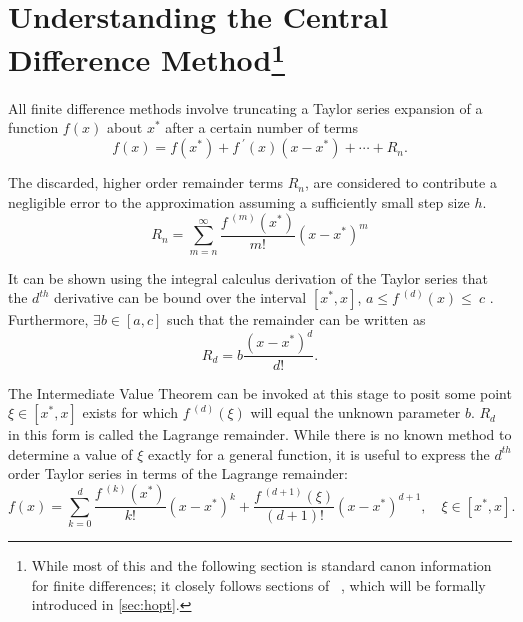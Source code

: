\section[Understanding Central Differences]{Understanding the Central Difference Method\footnote{While most of this and the following section is standard canon information for finite differences; it closely follows sections of \citeauthor{Mathur2012}~\cite{Mathur2012}, which will be formally introduced in \cref{sec:hopt}.}}\label{sec:ucdiff}

All finite difference methods involve truncating a Taylor series expansion of a function $f(x)$ about $x^*$ after a certain number of terms
\begin{equation}
    f(x) = f(x^*) + f^{\;\prime}(x)(x-x^*) + \cdots + R_n.
\end{equation}

The discarded, higher order remainder terms $R_n$, are considered to contribute a negligible error to the approximation assuming a sufficiently small step size $h$.
\begin{equation}
    R_n = \sum_{m=n}^\infty \frac{f^{\;(m)}(x^*)}{m!}(x-x^*)^m
\end{equation}

It can be shown using the integral calculus derivation of the Taylor series that the $d^{th}$ derivative can be bound over the interval $[x^*, x]$, \ie $a\leq f^{\;(d)}(x) \leq~c$ \cite{Greenberg1978}.
Furthermore, $\exists b \in [a,c]$ such that the remainder can be written as
\begin{equation}
   R_d = b \frac{(x-x^*)^d}{d!}.
\end{equation}

The Intermediate Value Theorem can be invoked at this stage to posit some point $\xi \in [x^*,x]$ exists for which $f^{\;(d)}(\xi)$ will equal the unknown parameter $b$.
$R_d$ in this form is called the Lagrange remainder.
While there is no known method to determine a value of $\xi$ exactly for a general function, it is useful to express the $d^{th}$ order Taylor series in terms of the Lagrange remainder:
\begin{equation}
    f(x) = \sum_{k=0}^d \frac{f^{\;(k)}(x^*)}{k!}(x-x^*)^k + \frac{f^{\;(d+1)}(\xi)}{(d+1)!}(x-x^*)^{d+1}, \quad \xi \in [x^*,x].\label{eq:taylorrem}
\end{equation}

